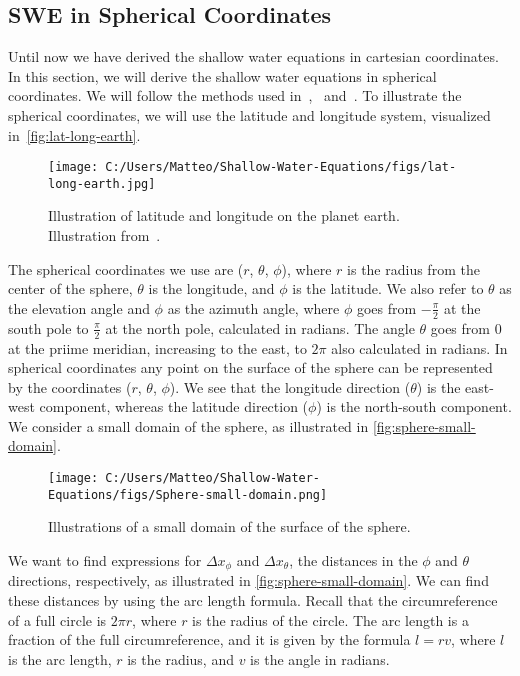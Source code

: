 \subsection{SWE in Spherical Coordinates}
Until now we have derived the shallow water equations in cartesian coordinates.
In this section, we will derive the shallow water equations in spherical coordinates.
We will follow the methods used in~\cite{Raymond},~\cite{Castro2017} and~\cite{Bihlo2022}.
To illustrate the spherical coordinates, we will use the latitude and longitude system, visualized in~\autoref{fig:lat-long-earth}.

\begin{figure}[H]
    \centering
    \texttt{[image: C:/Users/Matteo/Shallow-Water-Equations/figs/lat-long-earth.jpg]}
    \caption{Illustration of latitude and longitude on the planet earth.
    Illustration from~\cite{lat-long-earth}.}\label{fig:lat-long-earth}
\end{figure}
The spherical coordinates we use are ($r$, $\theta$, $\phi$), where $r$ is the radius from the center of the sphere, $\theta$ is the longitude, and $\phi$ is the latitude.
We also refer to $\theta$ as the elevation angle and $\phi$ as the azimuth angle, where $\phi$ goes from $-\frac{\pi}{2}$ at the south pole to $\frac{\pi}{2}$ at the north pole, calculated in radians.
The angle $\theta$ goes from $0$ at the priime meridian, increasing to the east, to $2\pi$ also calculated in radians.
In spherical coordinates any point on the surface of the sphere can be represented by the coordinates ($r$, $\theta$, $\phi$).
We see that the longitude direction ($\theta$) is the east-west component, whereas the latitude direction ($\phi$) is the north-south component.
We consider a small domain of the sphere, as illustrated in \autoref{fig:sphere-small-domain}.
\begin{figure}[H]
    \centering
    \texttt{[image: C:/Users/Matteo/Shallow-Water-Equations/figs/Sphere-small-domain.png]}
    \caption{Illustrations of a small domain of the surface of the sphere.}\label{fig:sphere-small-domain}
\end{figure}
We want to find expressions for $\Delta x_{\phi}$ and $\Delta x_{\theta}$, the distances in the $\phi$ and $\theta$ directions, respectively, as illustrated in \autoref{fig:sphere-small-domain}.
We can find these distances by using the arc length formula.
Recall that the circumreference of a full circle is $2\pi r$, where $r$ is the radius of the circle.
The arc length is a fraction of the full circumreference, and it is given by the formula $l = r v$, where $l$ is the arc length, $r$ is the radius, and $v$ is the angle in radians.
